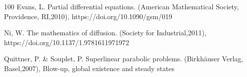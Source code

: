 \documentclass[12pt, a4paper]{article}
\theoremstyle{break}
\theoremstyle{break}
\theoremstyle{break}
\theoremstyle{break}
\theoremstyle{break}
\begin{document}
\begin{thebibliography}{100}
    Evans, L. Partial differential equations. (American Mathematical Society, Providence, RI,2010), https://doi.org/10.1090/gsm/019
    
    Ni, W. The mathematics of diffusion. (Society for Industrial,2011), https://doi.org/10.1137/1.9781611971972
    
    Quittner, P. \& Souplet, P. Superlinear parabolic problems. (Birkhäuser Verlag, Basel,2007), Blow-up, global existence and steady states

\end{thebibliography}
\end{document}
